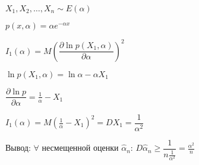 \begin{ex}
  $X_1, X_2, \dots, X_n \sim E(\alpha)$

  $p(x, \alpha) = \alpha e^{-\alpha x}$

  $I_1(\alpha) = M (\dfrac{\partial\ln p(X_1, \alpha)}{\partial\alpha})^2$

  $\ln p(X_1, \alpha) = \ln \alpha - \alpha X_1$

  $\dfrac{\partial \ln p}{\partial\alpha} = \frac{1}{\alpha} - X_1$

  $I_1(\alpha) = M (\frac{1}{\alpha} - X_1)^2 = D X_1 = \dfrac{1}{\alpha^2}$
\end{ex}

Вывод: $\forall$ несмещенной оценки $\hat\alpha_n$: $D \hat\alpha_n \geqslant \dfrac{1}{n \frac{1}{\alpha^2}} = \frac{\alpha^2}{n}$ 


